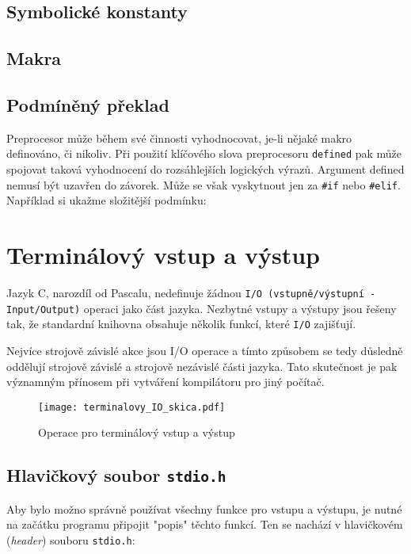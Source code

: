       \subsection{Symbolické konstanty}
      \subsection{Makra}
     
    \subsection{Podmíněný překlad}  
      Preprocesor může během své činnosti vyhodnocovat, je-li nějaké makro definováno, či nikoliv. 
      Při použití klíčového slova preprocesoru \texttt{defined} pak může spojovat taková 
      vyhodnocení do rozsáhlejších logických výrazů. Argument defined nemusí být uzavřen do 
      závorek. Může se však vyskytnout jen za \lstinline[basicstyle=\ttfamily]!#if! nebo 
      \lstinline[basicstyle=\ttfamily]!#elif!. Například si ukažme složitější podmínku:


  \section{Terminálový vstup a výstup}
    Jazyk C, narozdíl od Pascalu, nedefinuje žádnou \texttt{I/O (vstup\-ně/výstup\-ní 
    -In\-put/Out\-put)} operaci jako část jazyka. Nezbytné vstupy a výstupy jsou řešeny tak, že 
    standardní knihovna obsahuje několik funkcí, které \texttt{I/O} zajišťují.
  
    Nejvíce strojově závislé akce jsou I/O operace a tímto způsobem se tedy důsledně oddělují 
    strojově závislé a strojově nezávislé části jazyka. Tato skutečnost je pak významným přínosem 
    při vytváření kompilátoru pro jiný počítač.
  
    \begin{figure}[ht!]
      \centering
      \texttt{[image: terminalovy\_IO\_skica.pdf]}
      \caption{Operace pro terminálový vstup a výstup}\label{C:fig_Terminal_IO}
    \end{figure}
  
    \subsection{Hlavičkový soubor \texttt{stdio.h}}
      Aby bylo možno správně používat všechny funkce pro vstupu a výstupu, je nutné na začátku 
      programu připojit "popis" těchto funkcí. Ten se nachází v hlavičkovém (\emph{header}) souboru 
      \lstinline[basicstyle=\ttfamily]!stdio.h!:
  
